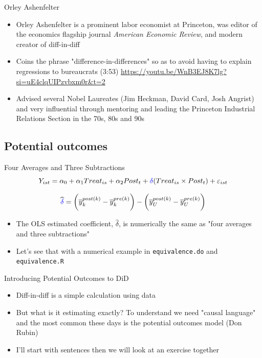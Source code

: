 \documentclass{beamer}
\begin{document}
\begin{frame}{Orley Ashenfelter}

\begin{itemize}

\item Orley Ashenfelter is a prominent labor economist at Princeton, was editor of the economics flagship journal \emph{American Economic Review}, and modern creator of diff-in-diff
\item Coins the phrase "difference-in-differences" so as to avoid having to explain regressions to bureaucrats (3:53)  \url{https://youtu.be/WnB3EJ8K7lg?si=uE4clqUIPzvbxm0r&t=2}
\item Advised several Nobel Laureates (Jim Heckman, David Card, Josh Angrist) and very influential through mentoring and leading the Princeton Industrial Relations Section in the 70s, 80s and 90s

\end{itemize}

\end{frame}



\subsection{Potential outcomes}




\begin{frame}{Four Averages and Three Subtractions}
$$Y_{ist} = \alpha_0 + \alpha_1 Treat_{is} + \alpha_2 Post_{t} + \textcolor{blue}{\delta} (Treat_{is} \times Post_t) + \varepsilon_{ist} $$

\bigskip

$$\widehat{\textcolor{blue}{\delta}} = \bigg ( \overline{y}_k^{post(k)} - \overline{y}_k^{pre(k)} \bigg ) - \bigg ( \overline{y}_U^{post(k)} - \overline{y}_U^{pre(k)} \bigg ) $$

\begin{itemize}
\item The OLS estimated coefficient, $\widehat{\delta}$, is numerically the same as "four averages and three subtractions"
\item Let's see that with a numerical example in \texttt{equivalence.do} and \texttt{equivalence.R}
\end{itemize}

\end{frame}

\begin{frame}{Introducing Potential Outcomes to DiD}

\begin{itemize}
\item Diff-in-diff is a simple calculation using data
\item But what is it estimating exactly?  To understand we need "causal language" and the most common these days is the potential outcomes model (Don Rubin)
\item I'll start with sentences then we will look at an exercise together
\end{itemize}

\end{frame}
\end{document}
